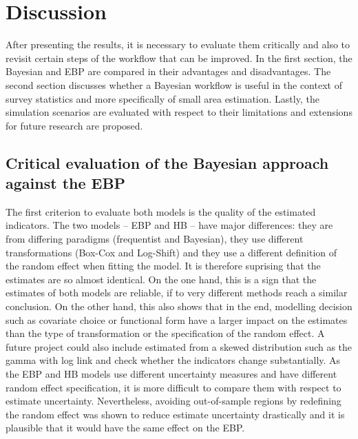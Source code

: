 \chapter{Discussion}

After presenting the results, it is necessary to evaluate them critically and also to revisit certain steps of the workflow that can be improved.
In the first section, the Bayesian and EBP are compared in their advantages and disadvantages.
The second section discusses whether a Bayesian workflow is useful in the context of survey statistics and more specifically of small area estimation.
Lastly, the simulation scenarios are evaluated with respect to their limitations and extensions for future research are proposed.


\section{Critical evaluation of the Bayesian approach against the EBP}

The first criterion to evaluate both models is the quality of the estimated indicators.
The two models – EBP and HB – have major differences:
they are from differing paradigms (frequentist and Bayesian), they use different transformations (Box-Cox and Log-Shift) and they use a different definition of the random effect when fitting the model.
It is therefore suprising that the estimates are so almost identical.
On the one hand, this is a sign that the estimates of both models are reliable, if to very different methods reach a similar conclusion.
On the other hand, this also shows that in the end, modelling decision such as covariate choice or functional form have a larger impact on the estimates than the type of transformation or the specification of the random effect.
A future project could also include estimated from a skewed distribution such as the gamma with log link and check whether the indicators change substantially.
As the EBP and HB models use different uncertainty measures and have different random effect specification, it is more difficult to compare them with respect to estimate uncertainty.
Nevertheless, avoiding out-of-sample regions by redefining the random effect was shown to reduce estimate uncertainty drastically and it is plausible that it would have the same effect on the EBP.

